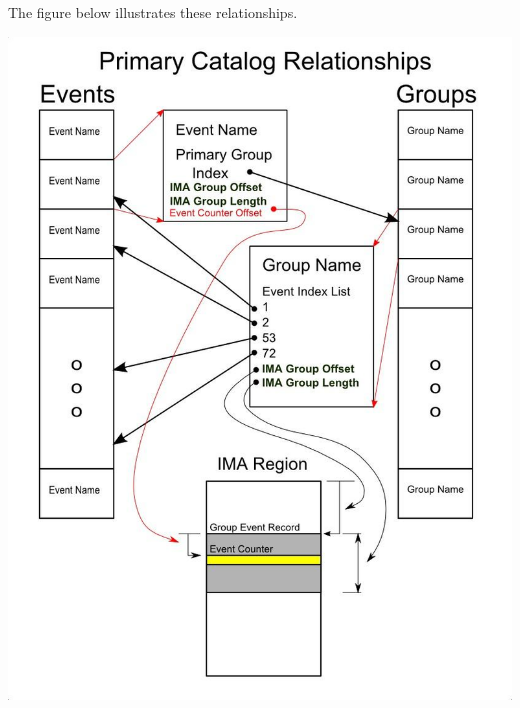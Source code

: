\documentclass[14]{article}
\begin{document}
The figure below illustrates these relationships.

\includegraphics[scale=0.6]{primary_catalog_relationships.jpeg}

\pagebreak
\end{document}
